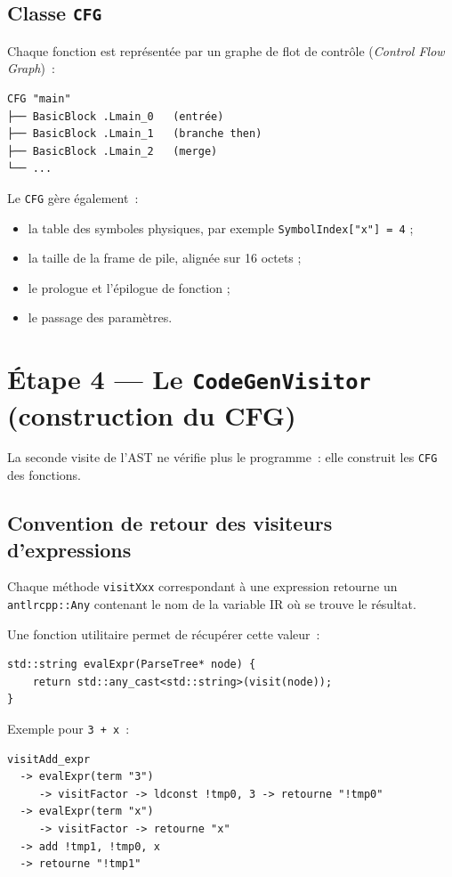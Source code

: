 \documentclass[11pt,a4paper]{article}
\begin{document}
\subsection{Classe \texttt{CFG}}

Chaque fonction est représentée par un graphe de flot de contrôle (\emph{Control Flow Graph})~:

\begin{lstlisting}
CFG "main"
├── BasicBlock .Lmain_0   (entrée)
├── BasicBlock .Lmain_1   (branche then)
├── BasicBlock .Lmain_2   (merge)
└── ...
\end{lstlisting}

Le \texttt{CFG} gère également~:
\begin{itemize}
  \item la table des symboles physiques, par exemple \texttt{SymbolIndex["x"] = 4} ;
  \item la taille de la frame de pile, alignée sur 16 octets ;
  \item le prologue et l'épilogue de fonction ;
  \item le passage des paramètres.
\end{itemize}

\section{Étape 4 --- Le \texttt{CodeGenVisitor} (construction du CFG)}

La seconde visite de l'AST ne vérifie plus le programme~: elle construit les \texttt{CFG} des fonctions.

\subsection{Convention de retour des visiteurs d'expressions}

Chaque méthode \texttt{visitXxx} correspondant à une expression retourne un \texttt{antlrcpp::Any} contenant le nom de la variable IR où se trouve le résultat.

Une fonction utilitaire permet de récupérer cette valeur~:

\begin{lstlisting}
std::string evalExpr(ParseTree* node) {
    return std::any_cast<std::string>(visit(node));
}
\end{lstlisting}

Exemple pour \texttt{3 + x}~:

\begin{lstlisting}
visitAdd_expr
  -> evalExpr(term "3")
     -> visitFactor -> ldconst !tmp0, 3 -> retourne "!tmp0"
  -> evalExpr(term "x")
     -> visitFactor -> retourne "x"
  -> add !tmp1, !tmp0, x
  -> retourne "!tmp1"
\end{lstlisting}
\end{document}
